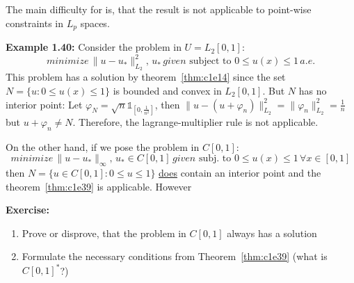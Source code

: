 \documentclass[../skript.tex]{subfiles}
\begin{document}
The main difficulty for is, that the result is not applicable to point-wise constraints in $L_p$ spaces.\par
\textbf{Example 1.40: } %
Consider the problem in $U = L_2[0,1]$:
\[
	minimize\,\|u-u_*\|^2_{L_2},\,u_*\,given\text{ subject to } 0 \leq u(x)\leq 1\,a.e.
\]
This problem has a solution by theorem~\ref{thm:c1e14} since the set $N = \{u:0\leq u(x)\leq 1\}$ is bounded and convex in $L_2[0,1]$. But $N$ has no interior point: Let $\varphi_N = \sqrt{n}\mathbb{1}_{[0,\frac{1}{n^2}]}$, then $\| u-(u+\varphi_n) \|_{L_2}^2 = \|\varphi_n\|_{L_2}^2 =\frac{1}{n}$ but $u+\varphi_n\not= N$. Therefore, the lagrange-multiplier rule is not applicable. \par On the other hand, if we pose the problem in $C[0,1]$:
\[
	minimize\,\|u-u_*\|_\infty,\,u_*\in C[0,1]\,given\text{ subj. to }0\leq u(x)\leq 1\,\forall x\in[0,1]
\]
then $N = \{u\in C[0,1]: 0\leq u\leq 1\}$ \underline{does} contain an interior point and the theorem~\ref{thm:c1e39} is applicable. However\par
\textbf{Exercise: }
\begin{enumerate}
\item Prove or disprove, that the problem in $C[0,1]$ always has a solution 
\item Formulate the necessary conditions from Theorem~\ref{thm:c1e39} (what is $C[0,1]^*$?)
\end{enumerate}
\end{document}
